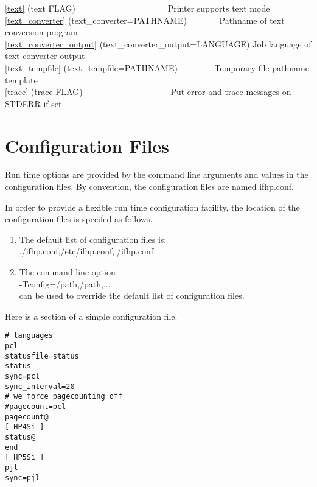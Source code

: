 \documentclass[a4paper]{article}
\begin{document}
{\ttfamily \ref{text} {(text FLAG)}}{\ttfamily ~~~~~~~~~~~~~~~~~~~~~} Printer supports text mode \\ 
{\ttfamily \ref{text_converter} {(text\_converter=PATHNAME)}}{\ttfamily ~~~~~~~} Pathname of text conversion program \\ 
{\ttfamily \ref{text_converter_output} {(text\_converter\_output=LANGUAGE)}}{\ttfamily } Job language of text converter output \\ 
{\ttfamily \ref{text_tempfile} {(text\_tempfile=PATHNAME)}}{\ttfamily ~~~~~~~~} Temporary file pathname template \\ 
{\ttfamily \ref{trace} {(trace FLAG)}}{\ttfamily ~~~~~~~~~~~~~~~~~~~~} Put error and trace messages on STDERR if set \\ 


\section{Configuration Files
\label{configfiles}}

Run time options are provided by the
command line arguments and values in the configuration  files.
By convention,
the configuration files are named
{\ttfamily ifhp.conf}.

In order to provide a flexible run time configuration facility,
the location of the configuration files is specifed as follows.
\begin{enumerate}
\item The default list of configuration files is:\\ 
{\ttfamily ./ifhp.conf,/etc/ifhp.conf,./ifhp.conf}
\item The command line option\\ 
{\ttfamily -Tconfig=/path,/path,...}\\ 
can be used to override the default list of configuration files.
\end{enumerate}


Here is a section of a simple configuration file.
\begin{tscreen}
\begin{verbatim}
# languages
pcl
statusfile=status
status
sync=pcl
sync_interval=20
# we force pagecounting off
#pagecount=pcl
pagecount@
[ HP4Si ]
status@
end
[ HP5Si ]
pjl
sync=pjl
\end{verbatim}
\end{tscreen}
\end{document}
